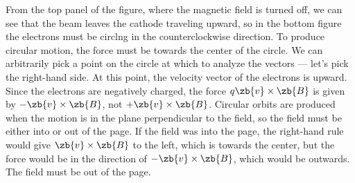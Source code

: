 From the top panel of the figure, where the magnetic field is turned
off, we can see that the beam leaves the cathode traveling upward, so
in the bottom figure the electrons must be circlng in the
counterclockwise direction. To produce circular motion, the force
must be towards the center of the circle. We can arbitrarily pick a
point on the circle at which to analyze the vectors --- let's pick
the right-hand side. At this point, the velocity vector of the
electrons is upward. Since the electrons are negatively charged, the
force $q\zb{v}\times\zb{B}$ is given by $-\zb{v}\times\zb{B}$, not 
$+\zb{v}\times\zb{B}$. Circular orbits are produced when the motion
is in the plane perpendicular to the field, so the field must be
either into or out of the page. If the field was into the page, the
right-hand rule would give $\zb{v}\times\zb{B}$ to the left, which is
towards the center, but the force would be in the direction of
$-\zb{v}\times\zb{B}$, which would be outwards. The field must be out
of the page.
